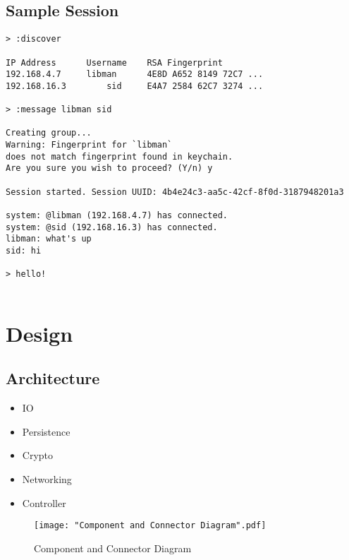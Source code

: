 \documentclass{scrartcl}
\begin{document}
\subsection{Sample Session}
\begin{lstlisting}
> :discover

IP Address		Username	RSA Fingerprint
192.168.4.7		libman		4E8D A652 8149 72C7 ...
192.168.16.3		sid		E4A7 2584 62C7 3274 ...

> :message libman sid

Creating group...
Warning: Fingerprint for `libman` 
does not match fingerprint found in keychain.
Are you sure you wish to proceed? (Y/n) y

Session started. Session UUID: 4b4e24c3-aa5c-42cf-8f0d-3187948201a3

system: @libman (192.168.4.7) has connected.
system: @sid (192.168.16.3) has connected.
libman: what's up
sid: hi

> hello!
		

\end{lstlisting}

\section{Design}
\subsection{Architecture}
\begin{itemize}
	\item IO
	\item Persistence
	\item Crypto
	\item Networking
	\item Controller
\end{itemize}

\begin{figure}[H]
	\texttt{[image: "Component and Connector Diagram".pdf]}
	\caption{Component and Connector Diagram}
\end{figure}
\end{document}
